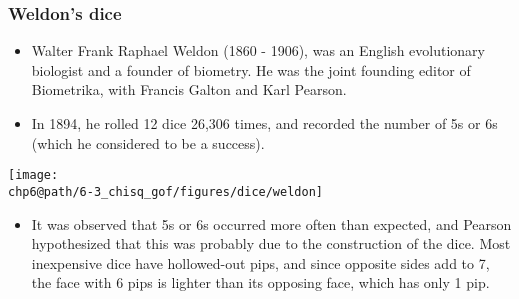 \documentclass[slidestop,compress,mathserif]{beamer}
\makeatletter
\def\chp6@path{../../Chp 6}
\makeatother
\begin{document}
\begin{frame}
\frametitle{Weldon's dice}

{
\begin{itemize}

\item Walter Frank Raphael Weldon (1860 - 1906), was an English evolutionary biologist and a founder of biometry. He was the joint founding editor of Biometrika, with Francis Galton and Karl Pearson.

\item In 1894, he rolled 12 dice 26,306 times, and recorded the number of 5s or 6s (which he considered to be a success).

\end{itemize}
}
{
\begin{center}
\texttt{[image: \\chp6@path/6-3\_chisq\_gof/figures/dice/weldon]}
\end{center}
}
\begin{itemize}

\item It was observed that 5s or 6s occurred more often than expected, and Pearson hypothesized that this was probably due to the construction of the dice. Most inexpensive dice have hollowed-out pips, and since opposite sides add to 7, the face with 6 pips is lighter than its opposing face, which has only 1 pip.

\end{itemize}

\end{frame}

\end{document}
